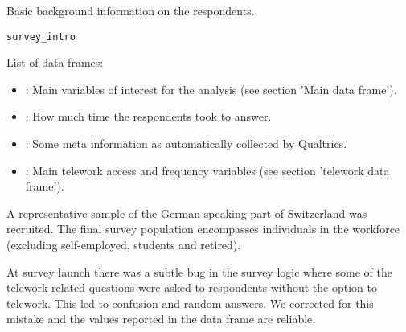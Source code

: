 
%
\begin{Description}
Basic background information on the respondents.
\end{Description}
%
\begin{Usage}
\begin{verbatim}
survey_intro
\end{verbatim}
\end{Usage}
%
\begin{Format}
List of data frames:
\begin{itemize}

\item{} : Main variables of interest for the analysis (see section 'Main data frame').
\item{} : How much time the respondents took to answer.
\item{} : Some meta information as automatically collected by Qualtrics.
\item{} : Main telework access and frequency variables (see section
'telework data frame').

\end{itemize}

\end{Format}
%
\begin{Details}
A representative sample of the German-speaking part of Switzerland was recruited.
The final survey population encompasses individuals in the workforce (excluding
self-employed, students and retired).

At survey launch there was a subtle bug in the survey logic where some of the
telework related questions were asked to respondents without the option to
telework. This led to confusion and random answers. We corrected for this mistake
and the values reported in the  data frame are reliable.
\end{Details}
%
